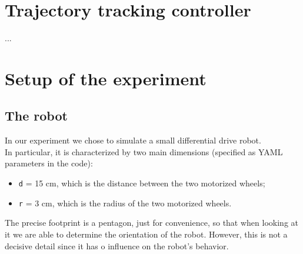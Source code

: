 \documentclass[11pt,a4paper]{article}
\begin{document}

\section{Trajectory tracking controller}

...



\section{Setup of the experiment}



\subsection{The robot}

In our experiment we chose to simulate a small differential drive robot.\\

In particular, it is characterized by two main dimensions (specified as YAML parameters in the code):
\begin{itemize}
    \item \texttt{d} = 15 cm, which is the distance between the two motorized wheels;
    \item \texttt{r} = 3 cm, which is the radius of the two motorized wheels.\\
\end{itemize}

The precise footprint is a pentagon, just for convenience, so that when looking at it we are able to determine the orientation of the robot.
However, this is not a decisive detail since it has o influence on the robot's behavior.


\end{document}

